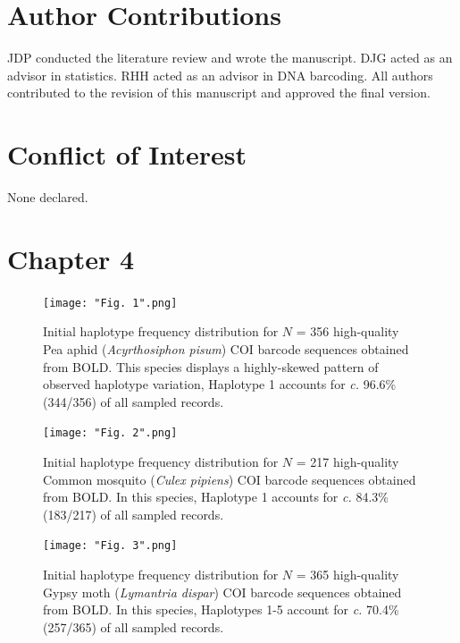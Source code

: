 \section*{Author Contributions}

JDP conducted the literature review and wrote the manuscript. DJG acted as an advisor in statistics. RHH acted as an advisor in DNA barcoding. All authors contributed to the revision of this manuscript and approved the final version. 



\section*{Conflict of Interest}

None declared.



\section{Chapter 4}

\begin{figure}[H]

\centering

\texttt{[image: "Fig. 1".png]}

\caption[Initial haplotype frequency distribution for Pea aphid (\textit{Acyrthosiphon pisum}).]{Initial haplotype frequency distribution for $N$ = 356 high-quality Pea aphid (\textit{Acyrthosiphon pisum}) COI barcode sequences obtained from BOLD. This species displays a highly-skewed pattern of observed haplotype variation, Haplotype 1 accounts for \textit{c.} 96.6\% (344/356) of all sampled records.}

\end{figure}
 
\begin{figure}[H]

\centering

\texttt{[image: "Fig. 2".png]}

\caption[Initial haplotype frequency distribution for Common mosquito (\textit{Culex pipiens}).]{Initial haplotype frequency distribution for $N$ = 217 high-quality Common mosquito (\textit{Culex pipiens}) COI barcode sequences obtained from BOLD. In this species, Haplotype 1 accounts for \textit{c.} 84.3\% (183/217) of all sampled records.}

\end{figure}


\begin{figure}[H]

\centering

\texttt{[image: "Fig. 3".png]}

\caption[Initial haplotype frequency distribution for Gypsy moth (\textit{Lymantria dispar}).]{Initial haplotype frequency distribution for $N$ = 365 high-quality Gypsy moth (\textit{Lymantria dispar}) COI barcode sequences obtained from BOLD. In this species, Haplotypes 1-5 account for \textit{c.} 70.4\% (257/365) of all sampled records.}


\end{figure}



